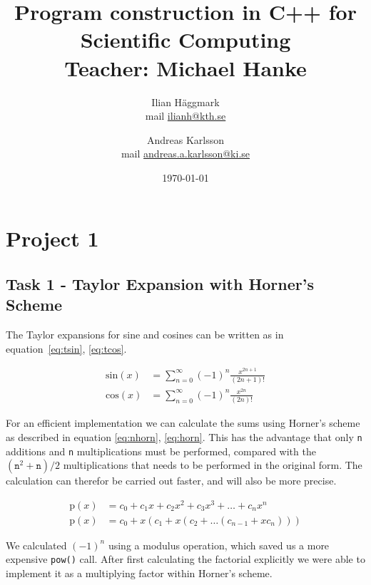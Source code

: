 \documentclass[paper=a4, fontsize=11pt]{article} %
\title{Program construction in C++ for Scientific Computing \\ Teacher: Michael Hanke}
\author{Ilian H{\"a}ggmark \\ mail \href{mailto:ilianh@kth.se}{ilianh@kth.se}
  \and Andreas Karlsson \\ mail \href{mailto:andreas.a.karlsson@ki.se}{andreas.a.karlsson@ki.se} }
\date{\normalsize\today} %
\begin{document}
\maketitle %

\section{Project 1}
\subsection{Task 1 - Taylor Expansion with Horner's Scheme}

The Taylor expansions for sine and cosines can be written as in
equation~\ref{eq:tsin}, \ref{eq:tcos}.

\begin{align}
  \text{sin}(x) &= \sum\limits_{n=0}^\infty{(-1)^{n}\frac{x^{2n+1}}{(2n+1)!}} \label{eq:tsin}\\
  \text{cos}(x) &= \sum\limits_{n=0}^\infty{(-1)^{n}\frac{x^{2n}}{(2n)!}} \label{eq:tcos}
\end{align}

\noindent
For an efficient implementation we can calculate the sums using
Horner's scheme as described in equation \ref{eq:nhorn},
\ref{eq:horn}. This has the advantage that only \texttt{n} additions
and \texttt{n} multiplications must be performed, compared with the
$(\mathtt{n}^{2} + \mathtt{n}) / 2$ multiplications that needs to be performed in the
original form. The calculation can therefor be carried out faster, and
will also be more precise.

\begin{align}
  \text{p}(x) &= c_{0} + c_{1}x + c_{2}x^{2} + c_{3}x^{3} +\dots+c_{n}x^{n} \label{eq:nhorn}\\
  \text{p}(x) &= c_{0} + x(c_{1} + x(c_{2} + \dots (c_{n-1} + xc_{n}))) \label{eq:horn}
\end{align}

\noindent
We calculated $(-1)^n$ using a modulus operation, which saved us a
more expensive \lstinline$pow()$ call. After first calculating the
factorial explicitly we were able to implement it as a multiplying
factor within Horner's scheme.
\end{document}
